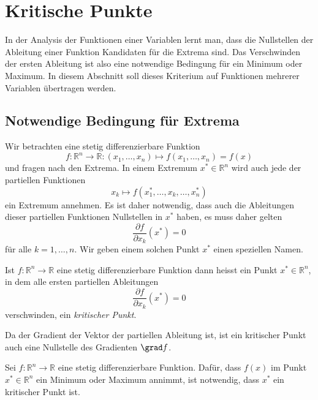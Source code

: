 %
%
%
\section{Kritische Punkte
\label{buch:fuvar:section:kritisch}}
In der Analysis der Funktionen einer Variablen lernt man, dass die
Nullstellen der Ableitung einer Funktion Kandidaten für die Extrema
sind.
Das Verschwinden der ersten Ableitung ist also eine notwendige Bedingung
für ein Minimum oder Maximum.
In diesem Abschnitt soll dieses Kriterium auf Funktionen mehrerer
Variablen übertragen werden.

%
%
\subsection{Notwendige Bedingung für Extrema
\label{buch:fuvar:subsection:kritisch}}
Wir betrachten eine stetig differenzierbare Funktion 
\[
f
\colon
\mathbb{R}^n\to\mathbb{R}
:
(x_1,\dots,x_n) \mapsto f(x_1,\dots,x_n) = f(x)
\]
und fragen nach den Extrema.
In einem Extremum $x^*\in\mathbb{R}^n$ wird auch jede der partiellen
Funktionen
\[
x_k \mapsto f(x_1^*,\dots,x_k,\dots,x_n^*)
\]
ein Extremum annehmen.
Es ist daher notwendig, dass auch die Ableitungen dieser partiellen
Funktionen Nullstellen in $x^*$ haben, es muss daher gelten
\begin{equation*}
\frac{\partial f}{\partial x_k}(x^*) = 0
\end{equation*}
für alle $k=1,\dots,n$.
Wir geben einem solchen Punkt $x^*$ einen speziellen Namen.

\begin{definition}
Ist $f\colon \mathbb{R}^n\to\mathbb{R}$ eine stetig differenzierbare
Funktion dann heisst ein Punkt $x^*\in\mathbb{R}^n$, in dem alle
ersten partiellen Ableitungen
\begin{equation}
\frac{\partial f}{\partial x_k}(x^*) = 0
\end{equation}
verschwinden, ein {\em kritischer Punkt}.
\end{definition}

Da der Gradient der Vektor der partiellen Ableitung ist, ist ein
kritischer Punkt auch eine Nullstelle des Gradienten $\grad f$.

\begin{satz}
Sei $f\colon\mathbb{R}^n\to\mathbb{R}$ eine stetig differenzierbare
Funktion.
Dafür, dass $f(x)$ im Punkt $x^*\in\mathbb{R}^n$ ein Minimum oder Maximum
annimmt, ist notwendig, dass $x^*$ ein kritischer Punkt ist.
\end{satz}


